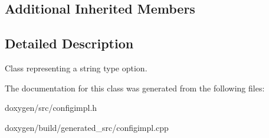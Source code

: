 \subsection*{Additional Inherited Members}


\subsection{Detailed Description}
Class representing a string type option. 

The documentation for this class was generated from the following files\+:\begin{DoxyCompactItemize}
\item 
doxygen/src/configimpl.\+h\item 
doxygen/build/generated\+\_\+src/configimpl.\+cpp\end{DoxyCompactItemize}
